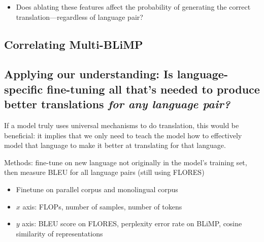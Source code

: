 \documentclass[11pt]{article}
\begin{document}
\begin{itemize}
    \item Does ablating these features affect the probability of generating the correct translation---regardless of language pair?

\end{itemize}


\subsection{Correlating Multi-BLiMP}


\subsection{Applying our understanding: Is language-specific fine-tuning all that's needed to produce better translations \emph{for any language pair?}}
If a model truly uses universal mechanisms to do translation, this would be beneficial: it implies that we only need to teach the model how to effectively model that language to make it better at translating for that language.

Methods: fine-tune on new language not originally in the model's training set, then measure BLEU for all language pairs (still using FLORES)


\begin{itemize}
    \item Finetune on parallel corpus and monolingual corpus
    \item $x$ axis: FLOPs, number of samples, number of tokens
    \item $y$ axis: BLEU score on FLORES, perplexity error rate on BLiMP, cosine similarity of representations
\end{itemize}
\end{document}
